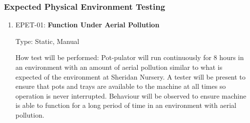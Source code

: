 \documentclass[12pt, titlepage]{article}
\begin{document}
\subsubsection{Expected Physical Environment Testing}

\begin{enumerate}

  \item{EPET-01: \textbf{Function Under Aerial Pollution}}
  
  Type: Static, Manual

  How test will be performed: Pot-pulator will run continuously for 8 hours in an environment with an amount of aerial pollution similar to 
  what is expected of the environment at Sheridan Nursery. A tester will be present to ensure that pots and trays are available to the machine
  at all times so operation is never interrupted. Behaviour will be observed to ensure machine is able to function for a long period of time in 
  an environment with aerial pollution.

\end{enumerate}
\end{document}
